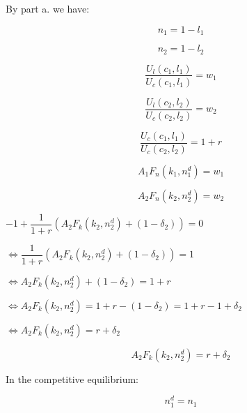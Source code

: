 \documentclass{article}
\begin{document}
By part \textrm{a.} we have:

\begin{equation}
    n_{1}=1-l_{1} 
\end{equation}

\begin{equation}
    n_{2}=1-l_{2} 
\end{equation}

\begin{equation}
    \dfrac{U_{l}\left(c_{1}, l_{1}\right)}{U_{c}\left(c_{1}, l_{1}\right)}=w_{1} 
\end{equation}

\begin{equation}
    \dfrac{U_{l}\left(c_{2}, l_{2}\right)}{U_{c}\left(c_{2}, l_{2}\right)}=w_{2} 
\end{equation}

\begin{equation}
    \dfrac{U_{c}\left(c_{1}, l_{1}\right)}{U_{c}\left(c_{2}, l_{2}\right)}=1+r 
\end{equation}

\begin{equation}
    A_{1}F_{n}\left(k_{1}, n^{d}_{1}\right)=w_{1}
\end{equation}

\begin{equation}
    A_{2}F_{n}\left(k_{2}, n^{d}_{2}\right)=w_{2}
\end{equation}

$-1+\dfrac{1}{1+r}\left(A_{2}F_{k}\left(k_{2}, n^{d}_{2}\right)+\left(1-\delta_{2}\right)\right)=0$

$\iff \dfrac{1}{1+r}\left(A_{2}F_{k}\left(k_{2}, n^{d}_{2}\right)+\left(1-\delta_{2}\right)\right)=1$

$\iff A_{2}F_{k}\left(k_{2}, n^{d}_{2}\right)+\left(1-\delta_{2}\right)=1+r$

$\iff A_{2}F_{k}\left(k_{2}, n^{d}_{2}\right)=1+r-\left(1-\delta_{2}\right)=1+r-1+\delta_{2}$

$\iff A_{2}F_{k}\left(k_{2}, n^{d}_{2}\right)=r+\delta_{2}$

\begin{equation}
    A_{2}F_{k}\left(k_{2}, n^{d}_{2}\right)=r+\delta_{2}
\end{equation}

In the competitive equilibrium:

\begin{equation}
    n^{d}_{1}=n_{1}
\end{equation}
\end{document}
